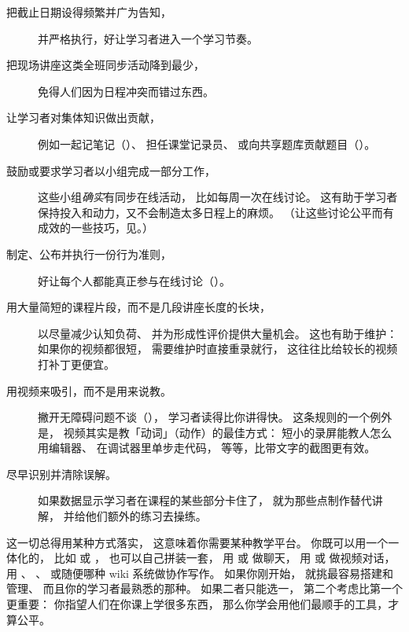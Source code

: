 \begin{description}

\item[把截止日期设得频繁并广为告知，]
  并严格执行，好让学习者进入一个学习节奏。

\item[把现场讲座这类全班同步活动降到最少，]
  免得人们因为日程冲突而错过东西。

\item[让学习者对集体知识做出贡献，]
  例如一起记笔记（）、
  担任课堂记录员、
  或向共享题库贡献题目（）。

\item[鼓励或要求学习者以小组完成一部分工作，]
  这些小组\emph{确实}有同步在线活动，
  比如每周一次在线讨论。
  这有助于学习者保持投入和动力，又不会制造太多日程上的麻烦。
  （让这些讨论公平而有成效的一些技巧，见。）

\item[制定、公布并执行一份行为准则，]
  好让每个人都能真正参与在线讨论（）。

\item[用大量简短的课程片段，而不是几段讲座长度的长块，]
  以尽量减少认知负荷、
  并为形成性评价提供大量机会。
  这也有助于维护：
  如果你的视频都很短，
  需要维护时直接重录就行，
  这往往比给较长的视频打补丁更便宜。

\item[用视频来吸引，而不是用来说教。]
  撇开无障碍问题不谈（），
  学习者读得比你讲得快。
  这条规则的一个例外是，
  视频其实是教「动词」（动作）的最佳方式：
  短小的录屏能教人怎么用编辑器、
  在调试器里单步走代码，
  等等，比带文字的截图更有效。

\item[尽早识别并清除误解。]
  如果数据显示学习者在课程的某些部分卡住了，
  就为那些点制作替代讲解，
  并给他们额外的练习去操练。

\end{description}

这一切总得用某种方式落实，
这意味着你需要某种教学平台。
你既可以用一个一体化的，
比如  或 ，
也可以自己拼装一套，
用  或  做聊天，
用 
或  做视频对话，
用 、
、
或随便哪种 wiki 系统做协作写作。
如果你刚开始，
就挑最容易搭建和管理、
而且你的学习者最熟悉的那种。
如果二者只能选一，
第二个考虑比第一个更重要：
你指望人们在你课上学很多东西，
那么你学会用他们最顺手的工具，才算公平。

